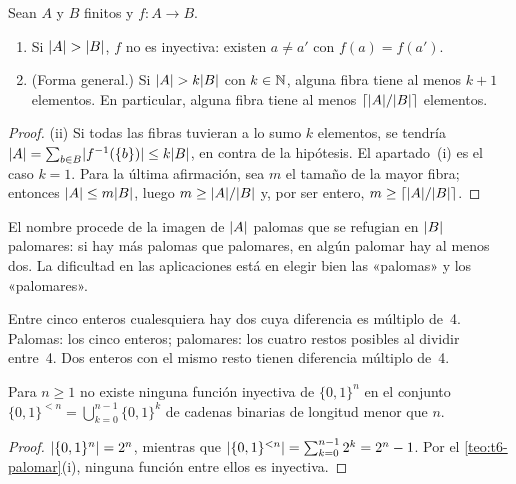 \begin{teorema}\label{teo:t6-palomar}
Sean $A$ y $B$ finitos y $f\colon A\to B$.
\begin{enumerate}
  \item Si $\lvert A\rvert>\lvert B\rvert$, $f$ no es inyectiva: existen $a\neq a'$ con $f(a)=f(a')$.
  \item (Forma general.) Si $\lvert A\rvert>k\lvert B\rvert$ con $k\in\mathbb{N}$, alguna fibra tiene al menos $k+1$ elementos. En particular, alguna fibra tiene al menos $\lceil\lvert A\rvert/\lvert B\rvert\rceil$ elementos.
\end{enumerate}
\end{teorema}

\begin{proof}
(ii) Si todas las fibras tuvieran a lo sumo $k$ elementos, se tendría $\lvert A\rvert=\sum_{b\in B}\lvert f^{-1}(\{b\})\rvert\le k\lvert B\rvert$, en contra de la hipótesis. El apartado~(i) es el caso $k=1$. Para la última afirmación, sea $m$ el tamaño de la mayor fibra; entonces $\lvert A\rvert\le m\lvert B\rvert$, luego $m\ge\lvert A\rvert/\lvert B\rvert$ y, por ser entero, $m\ge\lceil\lvert A\rvert/\lvert B\rvert\rceil$.
\end{proof}

El nombre procede de la imagen de $\lvert A\rvert$ palomas que se refugian en $\lvert B\rvert$ palomares: si hay más palomas que palomares, en algún palomar hay al menos dos. La dificultad en las aplicaciones está en elegir bien las «palomas» y los «palomares».

\begin{ejemplo}[Restos]\label{ej:t6-restos}
Entre cinco enteros cualesquiera hay dos cuya diferencia es múltiplo de~4. Palomas: los cinco enteros; palomares: los cuatro restos posibles al dividir entre~4. Dos enteros con el mismo resto tienen diferencia múltiplo de~4.
\end{ejemplo}

\begin{proposicion}\label{prop:t6-compresion}
Para $n\ge1$ no existe ninguna función inyectiva de $\{0,1\}^{n}$ en el conjunto $\{0,1\}^{<n}=\bigcup_{k=0}^{n-1}\{0,1\}^{k}$ de cadenas binarias de longitud menor que $n$.
\end{proposicion}

\begin{proof}
$\lvert\{0,1\}^{n}\rvert=2^{n}$, mientras que $\lvert\{0,1\}^{<n}\rvert=\sum_{k=0}^{n-1}2^{k}=2^{n}-1$. Por el \cref{teo:t6-palomar}(i), ninguna función entre ellos es inyectiva.
\end{proof}

